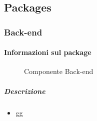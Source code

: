 \subsection{Packages}
  \subsubsection{Back-end}
  \paragraph{Informazioni sul package} 

    \begin{figure}[H] 
      \begin{center} 
        \caption{Componente Back-end}
      \end{center}  
    \end{figure} 

  \subparagraph{Descrizione} 
    \begin{itemize}
    \item[] gg
    \end{itemize} 
